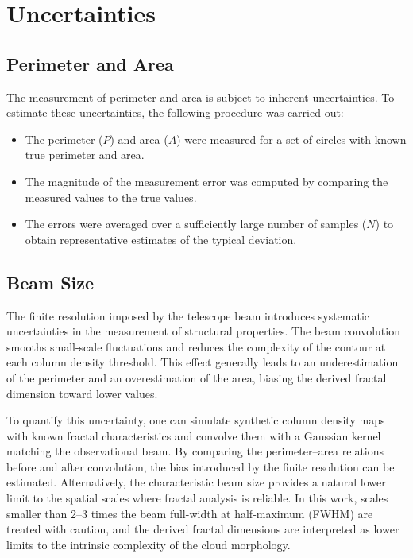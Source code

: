 \section{Uncertainties}

\subsection{Perimeter and Area}

The measurement of perimeter and area is subject to inherent uncertainties. To estimate these uncertainties, the following procedure was carried out:

\begin{itemize}
    \item The perimeter ($P$) and area ($A$) were measured for a set of circles with known true perimeter and area.
    \item The magnitude of the measurement error was computed by comparing the measured values to the true values.
    \item The errors were averaged over a sufficiently large number of samples ($N$) to obtain representative estimates of the typical deviation.
\end{itemize}

\subsection{Beam Size}

The finite resolution imposed by the telescope beam introduces systematic uncertainties in the measurement of structural properties. The beam convolution smooths small-scale fluctuations and reduces the complexity of the contour at each column density threshold. This effect generally leads to an underestimation of the perimeter and an overestimation of the area, biasing the derived fractal dimension toward lower values.

To quantify this uncertainty, one can simulate synthetic column density maps with known fractal characteristics and convolve them with a Gaussian kernel matching the observational beam. By comparing the perimeter–area relations before and after convolution, the bias introduced by the finite resolution can be estimated. Alternatively, the characteristic beam size provides a natural lower limit to the spatial scales where fractal analysis is reliable. In this work, scales smaller than 2–3 times the beam full-width at half-maximum (FWHM) are treated with caution, and the derived fractal dimensions are interpreted as lower limits to the intrinsic complexity of the cloud morphology.

